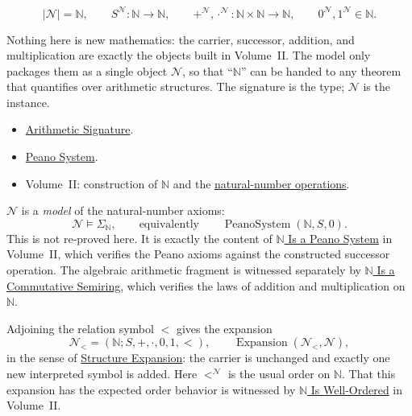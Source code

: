 \begin{remark*}
\[
|\mathcal{N}|=\mathbb{N},\qquad
S^{\mathcal{N}}:\mathbb{N}\to\mathbb{N},\qquad
+^{\mathcal{N}},\cdot^{\mathcal{N}}:\mathbb{N}\times\mathbb{N}\to\mathbb{N},
\qquad
0^{\mathcal{N}},1^{\mathcal{N}}\in\mathbb{N}.
\]
\end{remark*}

\begin{remark*}[Interpretation]
Nothing here is new mathematics: the carrier, successor, addition, and
multiplication are exactly the objects built in Volume~II. The model only
packages them as a single object $\mathcal{N}$, so that ``$\mathbb{N}$'' can be
handed to any theorem that quantifies over arithmetic structures. The signature
is the type; $\mathcal{N}$ is the instance.
\end{remark*}

\begin{remark*}[Dependencies]
\begin{itemize}
  \item \hyperref[def:arithmetic-signature]{Arithmetic Signature}.
  \item \hyperref[def:peano-system]{Peano System}.
  \item Volume~II: construction of $\mathbb{N}$ and the
        \hyperref[def:natural-number-operations]{natural-number operations}.
\end{itemize}
\end{remark*}

\begin{remark*}[Satisfaction]
$\mathcal{N}$ is a \emph{model} of the natural-number axioms:
\[
\mathcal{N}\models \Sigma_{\mathbb{N}},
\qquad\text{equivalently}\qquad
\operatorname{PeanoSystem}(\mathbb{N},S,0).
\]
This is not re-proved here. It is exactly the content of
\hyperref[thm:n-is-peano-system]{$\mathbb{N}$ Is a Peano System} in
Volume~II, which verifies the Peano axioms against the constructed successor
operation. The algebraic arithmetic fragment is witnessed separately by
\hyperref[thm:n-is-commutative-semiring]{$\mathbb{N}$ Is a Commutative Semiring},
which verifies the laws of addition and multiplication on $\mathbb{N}$.
\end{remark*}

\begin{remark*}
Adjoining the relation symbol $<$ gives the expansion
\[
\mathcal{N}_{<}=(\mathbb{N};S,+,\cdot,0,1,<),
\qquad
\operatorname{Expansion}(\mathcal{N}_{<},\mathcal{N}),
\]
in the sense of \hyperref[def:structure-expansion]{Structure Expansion}: the
carrier is unchanged and exactly one new interpreted symbol is added. Here
$<^{\mathcal{N}}$ is the usual order on $\mathbb{N}$. That this expansion has
the expected order behavior is witnessed by
\hyperref[thm:n-is-well-ordered]{$\mathbb{N}$ Is Well-Ordered} in Volume~II.
\end{remark*}

